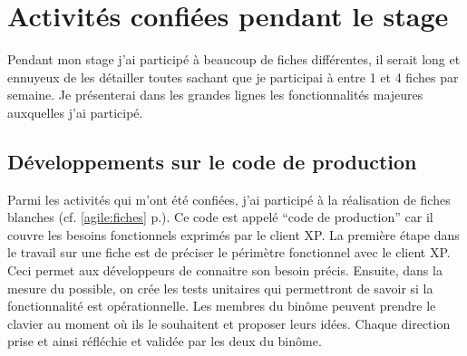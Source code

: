 \chapter{Activités confiées pendant le stage}
Pendant mon stage j'ai participé à beaucoup de fiches différentes, il serait long et ennuyeux de les détailler toutes sachant que je participai à entre 1 et 4 fiches par semaine. Je présenterai dans les grandes lignes les fonctionnalités majeures auxquelles j'ai participé. 
\section{Développements sur le code de production}
Parmi les activités qui m'ont été confiées, j'ai participé à la réalisation de fiches blanches (cf. \ref{agile:fiches} p.\pageref{agile:fiches}). Ce code est appelé ``code de production'' car il couvre les besoins fonctionnels exprimés par le client XP. La première étape dans le travail sur une fiche est de préciser le périmètre fonctionnel avec le client XP. Ceci permet aux développeurs de connaitre son besoin précis. Ensuite, dans la mesure du possible, on crée les tests unitaires qui permettront de savoir si la fonctionnalité est opérationnelle. Les membres du binôme peuvent prendre le clavier au moment où ils le souhaitent et proposer leurs idées. Chaque direction prise et ainsi réfléchie et validée par les deux du binôme.
